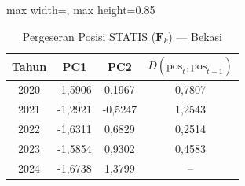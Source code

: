 \begin{table}[H]
\centering
\caption{Pergeseran Posisi STATIS ($\mathbf{F}_k$) --- Bekasi} \label{tab:app2jarak_statis_skor_bekasi}
\begin{adjustbox}{max width=\textwidth, max height=0.85\textheight}
\begin{tabular}{|c|c|c|c|}
\hline
\textbf{Tahun} & \textbf{PC1} & \textbf{PC2} & \textbf{$D(\text{pos}_t, \text{pos}_{t+1})$} \\
\hline
2020 & -1,5906 & 0,1967 & 0,7807 \\
2021 & -1,2921 & -0,5247 & 1,2543 \\
2022 & -1,6311 & 0,6829 & 0,2514 \\
2023 & -1,5854 & 0,9302 & 0,4583 \\
2024 & -1,6738 & 1,3799 & -- \\
\hline
\end{tabular}
\end{adjustbox}
\end{table}